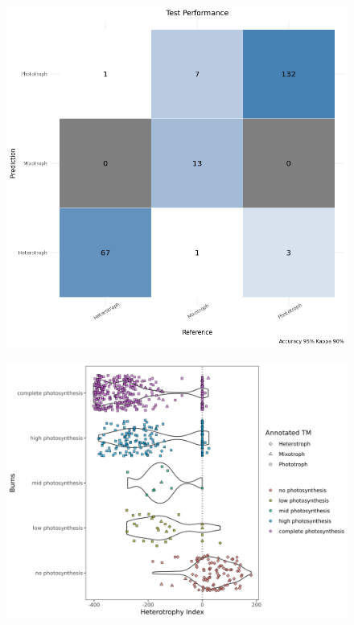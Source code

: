 \documentclass[12pt]{article}
\numberwithin{equation}{section}
\begin{document}
\begin{figure}
    \centering
    \includegraphics[width=0.95\columnwidth]{si-figures/confusionmatrix.png}
    \caption{}
    \label{fig:confusionmatrix}
\end{figure}

\begin{landscape}
    \begin{figure}
    \centering
    \includegraphics[width=0.95\columnwidth]{si-figures/burns_categories.png}
    \caption{}
    \label{fig:burns-cats}
\end{figure}
\end{landscape}
\end{document}
